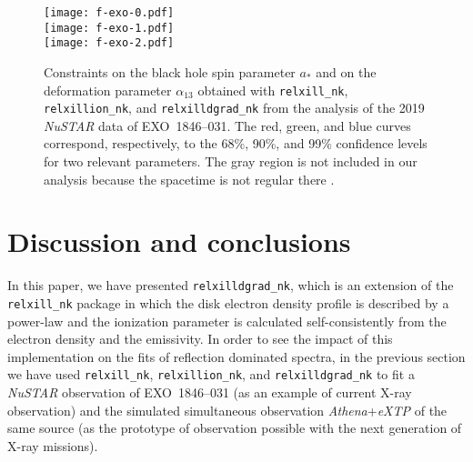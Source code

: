 \documentclass[twocolumn]{emulateapj}
\begin{document}
\begin{figure}
\begin{center}
\texttt{[image: f-exo-0.pdf]}\\
\texttt{[image: f-exo-1.pdf]}\\
\texttt{[image: f-exo-2.pdf]}
\end{center}
\vspace{-0.2cm}
\caption{Constraints on the black hole spin parameter $a_*$ and on the deformation parameter $\alpha_{13}$ obtained with {\tt relxill\_nk}, {\tt relxillion\_nk}, and {\tt relxilldgrad\_nk} from the analysis of the 2019 \textsl{NuSTAR} data of EXO~1846--031. The red, green, and blue curves correspond, respectively, to the 68\%, 90\%, and 99\% confidence levels for two relevant parameters. The gray region is not included in our analysis because the spacetime is not regular there \citep[see the discussion in][for more details]{2020arXiv201207469R}.  \label{f-exo}}
\end{figure}










\section{Discussion and conclusions} \label{s-dc}

In this paper, we have presented {\tt relxilldgrad\_nk}, which is an extension of the {\tt relxill\_nk} package in which the disk electron density profile is described by a power-law and the ionization parameter is calculated self-consistently from the electron density and the emissivity. In order to see the impact of this implementation on the fits of reflection dominated spectra, in the previous section we have used {\tt relxill\_nk}, {\tt relxillion\_nk}, and {\tt relxilldgrad\_nk} to fit a \textsl{NuSTAR} observation of EXO~1846--031 (as an example of current X-ray observation) and the simulated simultaneous observation \textsl{Athena}+\textsl{eXTP} of the same source (as the prototype of observation possible with the next generation of X-ray missions).
\end{document}
